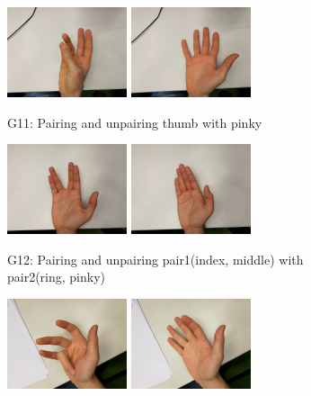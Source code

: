 \begin{figure}
  \begin{subfigure}[t]{0.5\linewidth}
  \includegraphics[width=100pt]{figures/ext_thumbtopinky}
  \includegraphics[width=100pt]{figures/flx_thumbtopinky}
  \caption{G11: Pairing and unpairing thumb with pinky}
  \end{subfigure}
  \hspace*{\fill}
  \begin{subfigure}[t]{0.5\linewidth}
  \includegraphics[width=100pt]{figures/ext_vulcan}
  \includegraphics[width=100pt]{figures/flx_vulcan}
  \caption{G12: Pairing and unpairing pair1(index, middle) with pair2(ring, pinky)}
  \end{subfigure}\par\medskip 
  \begin{subfigure}[t]{0.5\linewidth}
  \includegraphics[width=100pt]{figures/ext_wedding1}
  \includegraphics[width=100pt]{figures/flx_wedding1}

\end{subfigure}
\end{figure}
